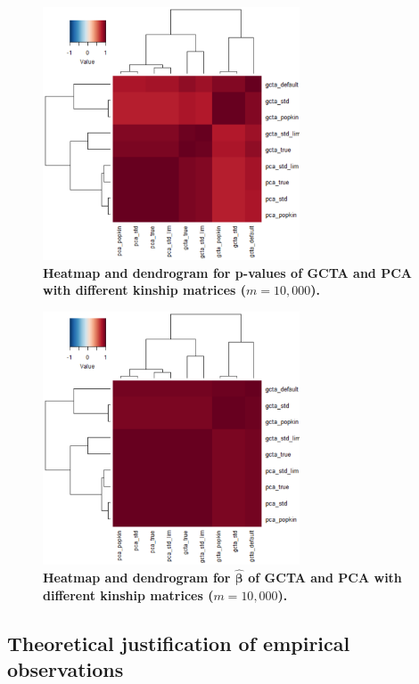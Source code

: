 \documentclass[11pt]{article}
\begin{document}
\begin{figure}[bp!]
  \centering
  \includegraphics[width=3in]{all_pval.pdf}
  \caption{
    {\bf Heatmap and dendrogram for p-values of GCTA and PCA with different kinship matrices ($m=10,000$).}
  }
  \label{fig:all_pval}
\end{figure}

\begin{figure}[bp!]
  \centering
  \includegraphics[width=3in]{all_beta_hat.pdf}
  \caption{
    {\bf Heatmap and dendrogram for $\hat{\mathbf{\beta}}$ of GCTA and PCA with different kinship matrices ($m=10,000$).}
  }
  \label{fig:all_beta_hat}
\end{figure}

\subsection{Theoretical justification of empirical observations}
\end{document}
